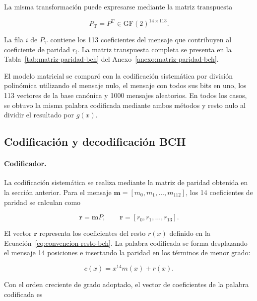 \documentclass[10pt,a4paper]{article}
\begin{document}
La misma transformación puede expresarse mediante la matriz transpuesta

\begin{equation}
    P_{\mathrm{T}}=P^{\mathrm{T}}
    \in\mathrm{GF}(2)^{14\times113}.
\end{equation}

La fila $i$ de $P_{\mathrm{T}}$ contiene los 113 coeficientes del mensaje que
contribuyen al coeficiente de paridad $r_i$. La matriz transpuesta completa se
presenta en la Tabla~\ref{tab:matriz-paridad-bch} del
Anexo~\ref{anexo:matriz-paridad-bch}.

El modelo matricial se comparó con la codificación sistemática por división
polinómica utilizando el mensaje nulo, el mensaje con todos sus bits en uno,
los 113 vectores de la base canónica y 1000 mensajes aleatorios. En todos los 
casos, se obtuvo la misma palabra codificada mediante ambos métodos y resto nulo 
al dividir el resultado por $g(x)$.

\subsection{Codificación y decodificación BCH}

\paragraph{Codificador.}
La codificación sistemática se realiza mediante la matriz de paridad obtenida
en la sección anterior. Para el mensaje
$\mathbf{m}=[m_0,m_1,\ldots,m_{112}]$, los 14 coeficientes de paridad se
calculan como

\begin{equation}
    \mathbf{r}=\mathbf{m}P,
    \qquad
    \mathbf{r}=[r_0,r_1,\ldots,r_{13}].
    \label{eq:paridad-matricial-codificador}
\end{equation}

El vector $\mathbf{r}$ representa los coeficientes del resto $r(x)$ definido
en la Ecuación~\eqref{eq:convencion-resto-bch}. La palabra codificada se forma
desplazando el mensaje 14 posiciones e insertando la paridad en los términos
de menor grado:

\begin{equation}
    c(x)=x^{14}m(x)+r(x).
    \label{eq:codeword}
\end{equation}

Con el orden creciente de grado adoptado, el vector de coeficientes de la
palabra codificada es
\end{document}
